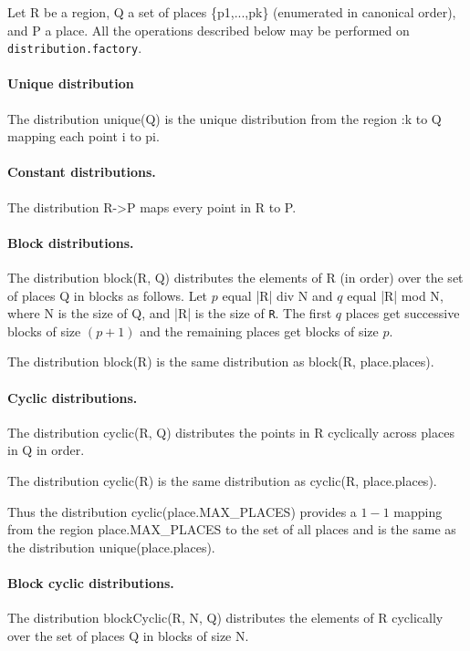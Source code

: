 Let {\cf R} be a region, {\cf Q} a set of places {\cf {}\{p1,...,pk\}}
(enumerated in canonical order), and {\cf P} a place. All the operations
described below may be performed on {\tt distribution.factory}.

\paragraph{Unique distribution} 
The distribution {\cf unique(Q)} is the unique distribution from the
region {:k} to {\cf Q} mapping each point {\cf i} to {\cf pi}.

\paragraph{Constant distributions.} 
The distribution {\cf R->P} maps every point in {\cf R} to {\cf P}.

\paragraph{Block distributions.}
The distribution {\cf block(R, Q)} distributes the elements of {\cf R}
(in order) over the set of places {\cf Q} in blocks  as
follows. Let $p$ equal {\cf |R| div N} and $q$ equal {\cf |R| mod N},
where {\cf N} is the size of {\cf Q}, and 
{\cf |R|} is the size of {\tt R}.  The first $q$ places get
successive blocks of size $(p+1)$ and the remaining places get blocks of
size $p$.

The distribution {\cf block(R)} is the same distribution as {\cf
block(R, place.places)}.

\paragraph{Cyclic distributions.} 
The distribution {\cf cyclic(R, Q)} distributes the points in {\cf R}
cyclically across places in {\cf Q} in order.

The distribution {\cf cyclic(R)} is the same distribution as {\cf 
cyclic(R, place.places)}.

Thus the distribution {\cf cyclic(place.MAX\_PLACES)} provides a $1-1$
mapping from the region {\cf place.MAX\_PLACES} to the set of all
places and is the same as the distribution {\cf unique(place.places)}.

\paragraph{Block cyclic distributions.}
The distribution {\cf blockCyclic(R, N, Q)} distributes the elements
of {\cf R} cyclically over the set of places {\cf Q} in blocks of size
{\cf N}.

